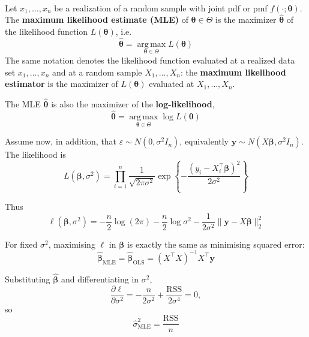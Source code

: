 \begin{definition} \leavevmode\\
    Let $x_1,\dots,x_n$ be a realization of a random sample with joint pdf or pmf $f(\cdot;\bm\theta)$. The \textbf{maximum likelihood estimate (MLE)} of $\bm\theta \in \Theta$ is the maximizer $\hat{\bm\theta}$ of the likelihood function $L(\bm\theta)$, i.e.
    \begin{equation*}
        \hat{\bm\theta} = \operatorname*{arg\,max}_{\bm\theta \in \Theta} L(\bm\theta)
    \end{equation*}
    The same notation denotes the likelihood function evaluated at a realized data set $x_1,\dots,x_n$ and at a random sample $X_1,\dots,X_n$: the \textbf{maximum likelihood estimator} is the maximizer of $L(\bm\theta)$ evaluated at $X_1,\dots,X_n$.

    The MLE $\hat{\bm\theta}$ is also the maximizer of the \textbf{log-likelihood},
    \begin{equation*}
        \hat{\bm\theta} = \operatorname*{arg\,max}_{\bm\theta \in \Theta} \log L(\bm\theta)
    \end{equation*}
\end{definition}

Assume now, in addition, that $\varepsilon \sim N(0,\sigma^2 I_n)$, equivalently $\mathbf{y} \sim N(X\bm\beta,\sigma^2 I_n)$. The likelihood is
\begin{equation*}
    L(\bm\beta,\sigma^2) = \prod_{i=1}^n \frac{1}{\sqrt{2\pi\sigma^2}}\exp\left\{-\frac{(y_i-X_i^\top\bm\beta)^2}{2\sigma^2}\right\}
\end{equation*}

Thus
\begin{equation*}
    \ell(\bm\beta,\sigma^2) = -\frac{n}{2}\log(2\pi) - \frac{n}{2}\log\sigma^2 - \frac{1}{2\sigma^2}\lVert \mathbf{y}-X\bm\beta \rVert_2^2
\end{equation*}

For fixed $\sigma^2$, maximising $\ell$ in $\bm\beta$ is exactly the same as minimising squared error:
\begin{equation*}
    \hat{\bm\beta}_{\text{MLE}} = \hat{\bm\beta}_{\text{OLS}} = (X^\top X)^{-1}X^\top \mathbf{y}
\end{equation*}

Substituting $\hat{\bm\beta}$ and differentiating in $\sigma^2$,
\begin{equation*}
    \frac{\partial \ell}{\partial \sigma^2} = -\frac{n}{2\sigma^2} + \frac{\text{RSS}}{2\sigma^4} = 0,
\end{equation*}
so
\begin{equation*}
    \hat\sigma^2_{\text{MLE}} = \frac{\text{RSS}}{n}
\end{equation*}

